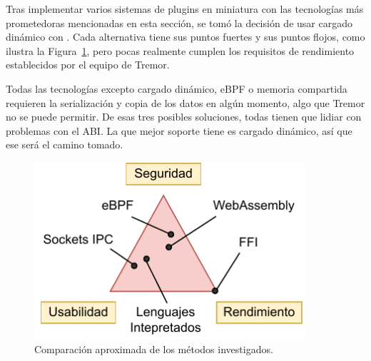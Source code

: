Tras implementar varios sistemas de plugins en miniatura con las tecnologías más
prometedoras mencionadas en esta sección, se tomó la decisión de usar cargado
dinámico con \abistable. Cada alternativa tiene sus puntos fuertes y sus puntos
flojos, como ilustra la Figura~\ref{fig:triangle}, pero pocas realmente
cumplen los requisitos de rendimiento establecidos por el equipo de Tremor.

Todas las tecnologías excepto cargado dinámico, eBPF o memoria compartida
requieren la serialización y copia de los datos en algún momento, algo que
Tremor no se puede permitir. De esas tres posibles soluciones, todas tienen que
lidiar con problemas con el ABI. La que mejor soporte tiene es cargado dinámico,
así que ese será el camino tomado.

\begin{figure}
    \centering
    \includegraphics[width=10cm]{./Imagenes/triangle.pdf}
    \caption{Comparación aproximada de los métodos investigados.}%
    \label{fig:triangle}
\end{figure}
